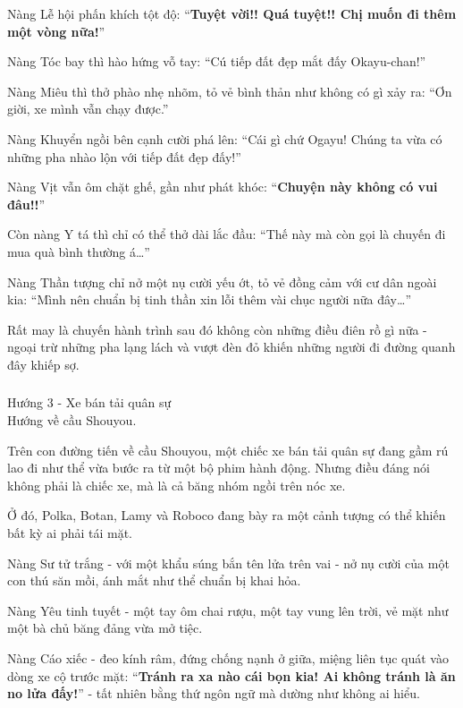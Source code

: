 \documentclass[../main.tex]{subfiles}
\begin{document}
Nàng Lễ hội phấn khích tột độ: ``\textbf{Tuyệt vời!! Quá tuyệt!! Chị muốn đi thêm một vòng nữa!}''

Nàng Tóc bay thì hào hứng vỗ tay: ``Cú tiếp đất đẹp mắt đấy Okayu-chan!''

Nàng Miêu thì thở phào nhẹ nhõm, tỏ vẻ bình thản như không có gì xảy ra: ``Ơn giời, xe mình vẫn chạy được.''

Nàng Khuyển ngồi bên cạnh cười phá lên: ``Cái gì chứ Ogayu! Chúng ta vừa có những pha nhào lộn với tiếp đất đẹp đấy!''

Nàng Vịt vẫn ôm chặt ghế, gần như phát khóc: ``\textbf{Chuyện này không có vui đâu!!}''

Còn nàng Y tá thì chỉ có thể thở dài lắc đầu: ``Thế này mà còn gọi là chuyến đi mua quà bình thường á\dots''

Nàng Thần tượng chỉ nở một nụ cười yếu ớt, tỏ vẻ đồng cảm với cư dân ngoài kia: ``Mình nên chuẩn bị tinh thần xin lỗi thêm vài chục người nữa đây\dots''

Rất may là chuyến hành trình sau đó không còn những điều điên rồ gì nữa - ngoại trừ những pha lạng lách và vượt đèn đỏ khiến những người đi đường quanh đây khiếp sợ.

\subsubsection*{\label{P1.1c}}

\begin{center}
    {\color{T3} Hướng 3 - Xe bán tải quân sự}\\Hướng về cầu Shouyou.
\end{center}

Trên con đường tiến về cầu Shouyou, một chiếc xe bán tải quân sự đang gầm rú lao đi như thể vừa bước ra từ một bộ phim hành động. Nhưng điều đáng nói không phải là chiếc xe, mà là cả băng nhóm ngồi trên nóc xe.

Ở đó, Polka, Botan, Lamy và Roboco đang bày ra một cảnh tượng có thể khiến bất kỳ ai phải tái mặt.

Nàng Sư tử trắng - với một khẩu súng bắn tên lửa trên vai - nở nụ cười của một con thú săn mồi, ánh mắt như thể chuẩn bị khai hỏa.

Nàng Yêu tinh tuyết - một tay ôm chai rượu, một tay vung lên trời, vẻ mặt như một bà chủ băng đảng vừa mở tiệc.

Nàng Cáo xiếc - đeo kính râm, đứng chống nạnh ở giữa, miệng liên tục quát vào dòng xe cộ trước mặt: ``\textbf{Tránh ra xa nào cái bọn kia! Ai không tránh là ăn no lửa đấy!}'' - tất nhiên bằng thứ ngôn ngữ mà dường như không ai hiểu.
\end{document}
